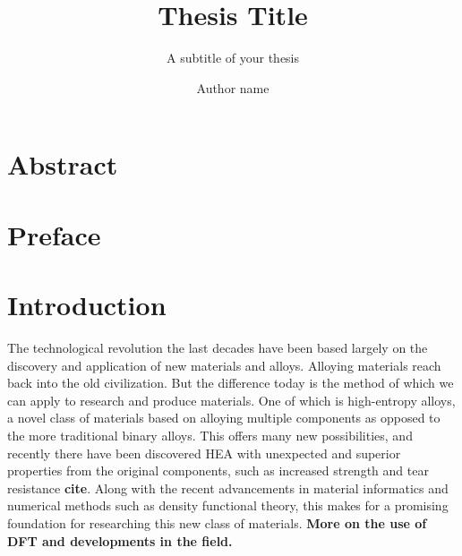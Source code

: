 \documentclass[UKenglish]{ifimaster}  %
\title{Thesis Title}        %
\subtitle{A subtitle of your thesis }         %
\author{Author name}                      %
\begin{document}
\duoforside[dept={Department Name <change at main.tex>},   %
  program={Master's Program Name <change at main.tex>},  %
  long]                                        %

\frontmatter{}  
\chapter*{Abstract}                   %

\tableofcontents{}
\listoffigures{}
\listoftables{}

\chapter*{Preface}                    %

\mainmatter{}

\chapter{Introduction}                  %
The technological revolution the last decades have been based largely on the discovery and application of new materials and alloys. Alloying materials reach back into the old civilization. But the difference today is the method of which we can apply to research and produce materials. One of which is high-entropy alloys, a novel class of materials based on alloying multiple components as opposed to the more traditional binary alloys. This offers many new possibilities, and recently there have been discovered HEA with unexpected and superior properties from the original components, such as increased strength and tear resistance \textbf{cite}. Along with the recent advancements in material informatics and numerical methods such as density functional theory, this makes for a promising foundation for researching this new class of materials. \textbf{More on the use of DFT and developments in the field.} 
\end{document}
